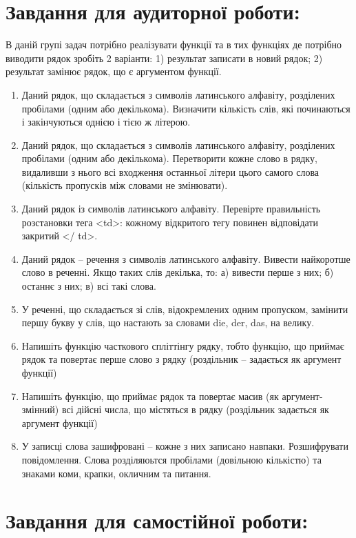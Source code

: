 \documentclass[a5paper,titlepage,openany,twoside,draft]{book_unv}%
\begin{document}
\section{Завдання для аудиторної роботи:}

В даній групі задач потрібно реалізувати функції та в тих функціях де
потрібно виводити рядок зробіть 2 варіанти: 1) результат записати в
новий рядок; 2) результат замінює рядок, що є аргументом функції.

\begin{enumerate}
\def\labelenumi{\arabic{enumi})}
\item
  Даний рядок, що складається з символів латинського алфавіту,
  розділених пробілами (одним або декількома). Визначити кількість слів,
  які починаються і закінчуються однією і тією ж літерою.
\item
  Даний рядок, що складається з символів латинського алфавіту,
  розділених пробілами (одним або декількома). Перетворити кожне слово в
  рядку, видаливши з нього всі входження останньої літери цього самого
  слова (кількість пропусків між словами не змінювати).
\item
  Даний рядок із символів латинського алфавіту. Перевірте правильність
  розстановки тега \textless{}td\textgreater{}: кожному відкритого тегу
  повинен відповідати закритий \textless{}/ td\textgreater{}.
\item
  Даний рядок -- речення з символів латинського алфавіту. Вивести
  найкоротше слово в реченні. Якщо таких слів декілька, то: 
  а) вивести перше з них; б) останнє з них; в) всі такі слова.
\item
  У реченні, що складається зі слів, відокремлених одним пропуском,
  замінити першу букву у слів, що настають за словами die, der, das, на
  велику.
\item
  Напишіть функцію часткового спліттінгу рядку, тобто функцію, що
  приймає рядок та повертає перше слово з рядку (роздільник -- задається
  як аргумент функції)
\item
  Напишіть функцію, що приймає рядок та повертає масив (як
  аргумент-змінний) всі дійсні числа, що містяться в рядку (роздільник
  задається як аргумент функції)
\item
  У записці слова зашифровані -- кожне з них записано навпаки.
  Розшифрувати повідомлення. Слова розділяюьтся пробілами (довільною кількістю)
  та знаками коми, крапки, окличним та питання. 
\end{enumerate}

\section{Завдання для самостійної роботи:}
\end{document}
